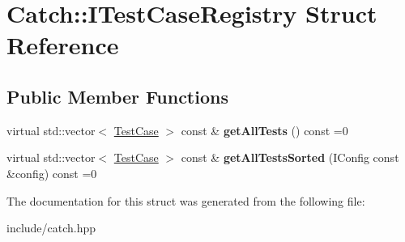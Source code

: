 \hypertarget{structCatch_1_1ITestCaseRegistry}{}\section{Catch\+:\+:I\+Test\+Case\+Registry Struct Reference}
\label{structCatch_1_1ITestCaseRegistry}
\subsection*{Public Member Functions}
\begin{DoxyCompactItemize}
\item 
virtual std\+::vector$<$ \hyperlink{classCatch_1_1TestCase}{Test\+Case} $>$ const \& {\bfseries get\+All\+Tests} () const =0\hypertarget{structCatch_1_1ITestCaseRegistry_ad6e4d4a621655123f73ae98cfeda063d}{}\label{structCatch_1_1ITestCaseRegistry_ad6e4d4a621655123f73ae98cfeda063d}

\item 
virtual std\+::vector$<$ \hyperlink{classCatch_1_1TestCase}{Test\+Case} $>$ const \& {\bfseries get\+All\+Tests\+Sorted} (I\+Config const \&config) const =0\hypertarget{structCatch_1_1ITestCaseRegistry_a33e46639d0319d35497c05bb5d02be5a}{}\label{structCatch_1_1ITestCaseRegistry_a33e46639d0319d35497c05bb5d02be5a}

\end{DoxyCompactItemize}


The documentation for this struct was generated from the following file\+:\begin{DoxyCompactItemize}
\item 
include/catch.\+hpp\end{DoxyCompactItemize}
